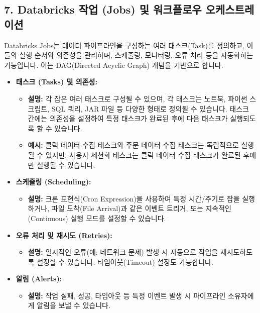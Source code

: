 \documentclass[11pt,a4paper]{article}
\theoremstyle{definition}
\begin{document}
\subsection*{7. Databricks 작업 (Jobs) 및 워크플로우 오케스트레이션}

Databricks Jobs는 데이터 파이프라인을 구성하는 여러 태스크(Task)를 정의하고, 이들의 실행 순서와 의존성을 관리하며, 스케줄링, 모니터링, 오류 처리 등을 자동화하는 기능입니다. 이는 DAG(Directed Acyclic Graph) 개념을 기반으로 합니다.

\begin{tcolorbox}[title=\textbf{Databricks Jobs의 주요 기능}, colback=blue!5!white, colframe=blue!75!black, sharp corners, boxrule=0.8pt]
\begin{itemize}
    \item \textbf{태스크 (Tasks) 및 의존성:}
    \begin{itemize}
        \item \textbf{설명:} 각 잡은 여러 태스크로 구성될 수 있으며, 각 태스크는 노트북, 파이썬 스크립트, SQL 쿼리, JAR 파일 등 다양한 형태로 정의될 수 있습니다. 태스크 간에는 의존성을 설정하여 특정 태스크가 완료된 후에 다음 태스크가 실행되도록 할 수 있습니다.
        \item \textbf{예시:} 클릭 데이터 수집 태스크와 주문 데이터 수집 태스크는 독립적으로 실행될 수 있지만, 사용자 세션화 태스크는 클릭 데이터 수집 태스크가 완료된 후에만 실행될 수 있습니다.
    \end{itemize}
    \item \textbf{스케줄링 (Scheduling):}
    \begin{itemize}
        \item \textbf{설명:} 크론 표현식(Cron Expression)을 사용하여 특정 시간/주기로 잡을 실행하거나, 파일 도착(File Arrival)과 같은 이벤트 트리거, 또는 지속적인(Continuous) 실행 모드를 설정할 수 있습니다.
    \end{itemize}
    \item \textbf{오류 처리 및 재시도 (Retries):}
    \begin{itemize}
        \item \textbf{설명:} 일시적인 오류(예: 네트워크 문제) 발생 시 자동으로 작업을 재시도하도록 설정할 수 있습니다. 타임아웃(Timeout) 설정도 가능합니다.
    \end{itemize}
    \item \textbf{알림 (Alerts):}
    \begin{itemize}
        \item \textbf{설명:} 작업 실패, 성공, 타임아웃 등 특정 이벤트 발생 시 파이프라인 소유자에게 알림을 보낼 수 있습니다.

\end{itemize}
\end{itemize}
\end{tcolorbox}
\end{document}
